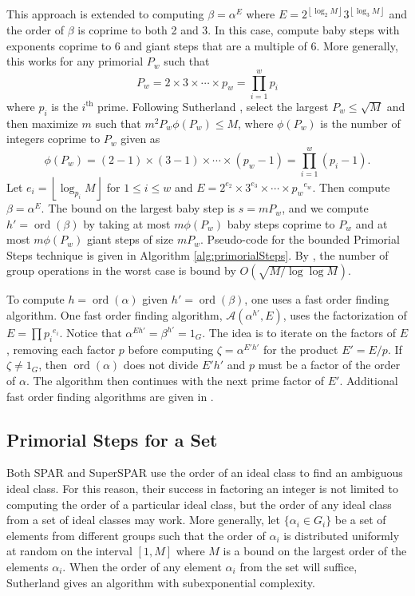 \documentclass{ucalgthes1}
\theoremstyle{definition}
\DeclareMathOperator{\ord}{ord}
\newcommand{\floor}[1]{\left\lfloor #1 \right\rfloor}
\begin{document}
This approach is extended to computing $\beta = \alpha^E$ where $E = 2^{\floor{\log_2 M}} 3^{\floor{\log_3 M}}$ and the order of $\beta$ is coprime to both 2 and 3.  In this case, compute baby steps with exponents coprime to 6 and giant steps that are a multiple of 6.  More generally, this works for any primorial $P_w$ such that
\[
	P_w = 2 \times 3 \times \cdots \times p_w = \prod_{i=1}^w p_i
\]
where $p_i$ is the $i^{\textrm{th}}$ prime.  Following Sutherland \cite[p.57]{Sutherland2007}, select the largest $P_w \le \sqrt{M}$ and then maximize $m$ such that $m^2P_w \phi(P_w) \le M$, where $\phi(P_w)$ is the number of integers coprime to $P_w$ given as
\begin{equation}
\label{eq:phiPrimorial}
	\phi(P_w) = (2-1) \times (3-1) \times \cdots \times (p_w - 1) = \prod_{i=1}^w (p_i - 1).
\end{equation}
Let $e_i = \floor{\log_{p_i} M}$ for $1 \le i \le w$ and $E = 2^{e_2} \times 3^{e_3} \times \cdots \times {p_w}^{e_w}$.  Then compute $\beta = \alpha^E$.  The bound on the largest baby step is $s = m P_w$, and we compute $h' = \ord(\beta)$ by taking at most $m \phi(P_w)$ baby steps coprime to $P_w$ and at most $m \phi(P_w)$ giant steps of size $m P_w$.  Pseudo-code for the bounded Primorial Steps technique is given in Algorithm \ref{alg:primorialSteps}.  By \cite[p.59~Proposition~4.2]{Sutherland2007}, the number of group operations in the worst case is bound by $O(\sqrt{M / \log \log M})$.

To compute $h = \ord(\alpha)$ given $h' = \ord(\beta)$, one uses a fast order finding algorithm.  One fast order finding algorithm, $\mathcal A(\alpha^{h'}, E)$, uses the factorization of $E=\prod {p_i}^{e_i}$.  Notice that $\alpha^{Eh'} = \beta^{h'} = 1_G$.  The idea is to iterate on the factors of $E$, removing each factor $p$ before computing $\zeta = \alpha^{E'h'}$ for the product $E' = E/p$. If $\zeta \neq 1_G$, then $\ord(\alpha)$ does not divide $E'h'$ and $p$ must be a factor of the order of $\alpha$.  The algorithm then continues with the next prime factor of $E'$.  Additional fast order finding algorithms are given in \mbox{\cite[Chapter~7]{Sutherland2007}}.

\subsection{Primorial Steps for a Set}
\label{subsec:primorialStepsForASet}

Both SPAR and SuperSPAR use the order of an ideal class to find an ambiguous ideal class.  For this reason, their success in factoring an integer is not limited to computing the order of a particular ideal class, but the order of any ideal class from a set of ideal classes may work.  More generally, let $\{ \alpha_i \in G_i \}$ be a set of elements from different groups such that the order of $\alpha_i$ is distributed uniformly at random on the interval $[1, M]$ where $M$ is a bound on the largest order of the elements $\alpha_i$.  When the order of any element $\alpha_i$ from the set will suffice, Sutherland \cite[\S 5.4]{Sutherland2007} gives an algorithm with subexponential complexity.
\end{document}
